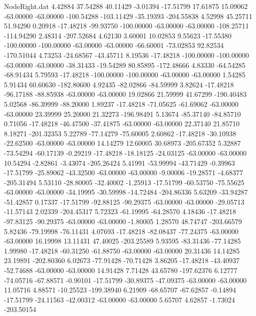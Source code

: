 \begin{filecontents}{NodeRight.dat}
   4.42884   37.54288   40.11429    -3.01394  -17.51799   17.61875   15.09062  -63.00000  -63.00000 -100.54288 -103.11429  -35.19393 -204.55838
   4.52998   45.25711   51.94290     0.20918  -17.48218  -99.93750 -100.00000  -63.00000  -63.00000 -108.25711 -114.94290    2.48314 -207.52684
   4.62130    3.60001   10.02853     9.55623  -17.55380 -100.00000 -100.00000  -63.00000  -63.00000  -66.60001  -73.02853   92.82534 -170.51044
   4.73253  -24.68567  -43.45711     8.19536  -17.48218 -100.00000 -100.00000  -63.00000  -63.00000  -38.31433  -19.54289   80.85895 -172.48666
   4.83330  -64.54285  -68.91434     5.79593  -17.48218 -100.00000 -100.00000  -63.00000  -63.00000    1.54285    5.91434   60.60630 -182.80600
   4.92435  -82.02866  -84.59999     3.82624  -17.48218  -96.17188  -88.85938  -63.00000  -63.00000   19.02866   21.59999   41.67299 -190.40483
   5.02568  -86.39999  -88.20000     1.89237  -17.48218  -71.05625  -61.69062  -63.00000  -63.00000   23.39999   25.20000   21.32273 -196.98491
   5.13674  -85.37140  -84.85710     0.71056  -17.48218  -46.47500  -37.41875  -63.00000  -63.00000   22.37140   21.85710    8.18271 -201.32353
   5.22789  -77.14279  -75.60005     2.60862  -17.48218  -30.10938  -22.62500  -63.00000  -63.00000   14.14279   12.60005   30.68973 -205.67352
   5.32887  -73.54294  -60.17139    -0.29219  -17.48218  -18.18125  -24.03125  -63.00000  -63.00000   10.54294   -2.82861   -3.43074 -205.26424
   5.41991  -53.99994  -43.71429    -0.39963  -17.51799  -25.89062  -43.32500  -63.00000  -63.00000   -9.00006  -19.28571   -4.68377 -205.31494
   5.53110  -28.80005  -32.40002    -1.25913  -17.51799  -60.53750  -75.55625  -63.00000  -63.00000  -34.19995  -30.59998  -14.72484 -204.86336
   5.63209  -33.94287  -51.42857     0.17337  -17.51799  -92.88125  -90.29375  -63.00000  -63.00000  -29.05713  -11.57143    2.02339 -204.45317
   5.72323  -61.19995  -64.28570     4.18436  -17.48218  -97.83125  -90.29375  -63.00000  -63.00000   -1.80005    1.28570   48.74747 -203.66579
   5.82436  -79.19998  -76.11431     4.07693  -17.48218  -82.08437  -77.24375  -63.00000  -63.00000   16.19998   13.11431   47.40025 -203.25589
   5.93595  -83.31436  -77.14285     1.99980  -17.48218  -60.31250  -61.88750  -63.00000  -63.00000   20.31436   14.14285   23.19891 -202.80360
   6.02673  -77.91428  -70.71428     3.86205  -17.48218  -43.40937  -52.74688  -63.00000  -63.00000   14.91428    7.71428   43.65780 -197.62376
   6.12777  -74.05716  -67.88571    -0.90101  -17.51799  -30.89375  -47.09375  -63.00000  -63.00000   11.05716    4.88571  -10.25523 -199.38940
   6.21909  -68.65707  -67.62857    -0.14894  -17.51799  -24.11563  -42.00312  -63.00000  -63.00000    5.65707    4.62857   -1.73024 -203.50154

\end{filecontents}
